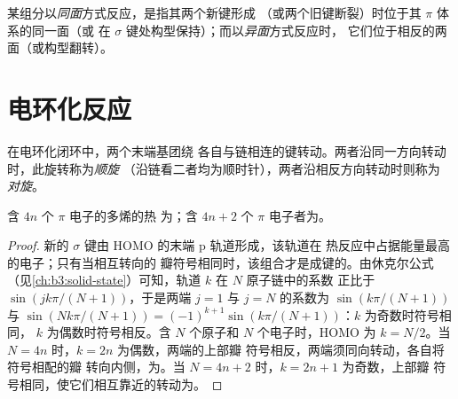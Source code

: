 \begin{definition}[同面与异面]\label{def:b3:pericyclic:faciality}
某组分以\emph{同面}方式反应，是指其两个新键形成
（或两个旧键断裂）时位于其 $\pi$ 体系的同一面（或
在 $\sigma$ 键处构型保持）；而以\emph{异面}方式反应时，
它们位于相反的两面（或构型翻转）。
\end{definition}

\section{电环化反应}

\begin{definition}[顺旋与对旋]\label{def:b3:pericyclic:rotation-modes}
在电环化闭环中，两个末端基团绕
各自与链相连的键转动。两者沿同一方向转动时，此旋转称为\emph{顺旋}
（沿链看二者均为顺时针），两者沿相反方向转动时则称为
\emph{对旋}。
\end{definition}

\begin{theorem}[电环化反应]\label{thm:b3:pericyclic:electrocyclic}
含 $4n$ 个 $\pi$ 电子的多烯的热
为；含 $4n + 2$ 个 $\pi$ 电子者为。
\end{theorem}

\begin{proof}
新的 $\sigma$ 键由 HOMO 的末端 p 轨道形成，该轨道在
热反应中占据能量最高的电子；只有当相互转向的
瓣符号相同时，该组合才是成键的。由休克尔公式
（见\cref{ch:b3:solid-state}）可知，轨道 $k$ 在 $N$ 原子链中的系数
正比于 $\sin(jk\pi/(N + 1))$，于是两端 $j = 1$ 与 $j = N$ 的系数为
$\sin(k\pi/(N + 1))$ 与 $\sin(Nk\pi/(N + 1)) = (-1)^{k+1}\sin(k\pi/(N + 1))$：$k$ 为奇数时符号相同，
$k$ 为偶数时符号相反。含 $N$ 个原子和 $N$ 个电子时，HOMO 为
$k = N/2$。当 $N = 4n$ 时，$k = 2n$ 为偶数，两端的上部瓣
符号相反，两端须同向转动，各自将符号相配的瓣
转向内侧，为。当 $N = 4n + 2$ 时，$k = 2n + 1$ 为奇数，上部瓣
符号相同，使它们相互靠近的转动为。
\end{proof}

